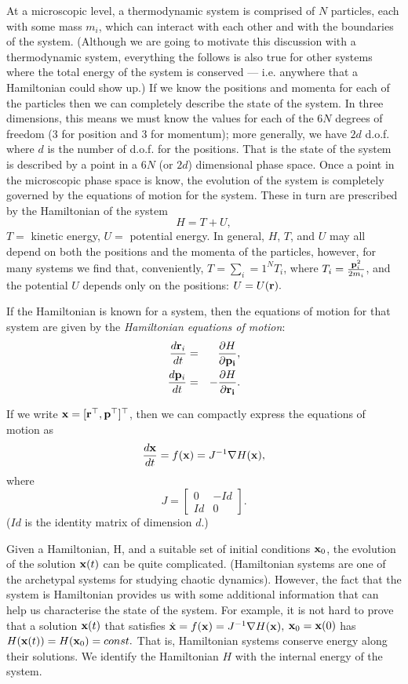 \documentclass{article}
\begin{document}
At a microscopic level, a thermodynamic system is comprised of $N$ particles, each with some mass $m_i$, which can interact with each other and with the boundaries of the system. (Although we are going to motivate this discussion with a thermodynamic system, everything the follows is also true for other systems where the total energy of the system is conserved --- i.e. anywhere that a Hamiltonian could show up.) If we know the positions and momenta  for each of the particles then we can completely describe the state of the system. In three dimensions, this means we must know the values for each of the $6N$ degrees of freedom (3 for position and 3 for momentum); more generally, we have $2d$ d.o.f. where $d$ is the number of d.o.f. for the positions. That is the state of the system is described by a point in a $6N$ (or $2d$) dimensional phase space.
Once a point in the microscopic phase space is know, the evolution of the system is completely governed by the equations of motion for the system. These in turn are prescribed by the Hamiltonian of the system
$$H = T+U,$$
$T=$ kinetic energy, $U=$ potential energy. In general, $H$, $T$, and $U$ may all depend on both the positions and the momenta of the particles, however, for many systems we find that, conveniently, $T = \sum_i=1^N T_i$, where $T_i=\frac{{\bf p}_i^2}{2m_i}$, and the potential $U$ depends only on the positions: $U = U({\bf r}).$

If the Hamiltonian is known for a system, then the equations of motion for that system are given by the \textit{Hamiltonian equations of motion}:
\begin{eqnarray*}
	\frac{d{\bf r}_i}{dt} &=& ~~\frac{\partial H}{\partial {\bf p_i}}, \\
	\frac{d{\bf p}_i}{dt} &=& -\frac{\partial H}{\partial {\bf r_i}}.
\end{eqnarray*}

If we write ${\bf x} = [{\bf r}^\top,{\bf p}^\top]^\top$, then we can compactly express the equations of motion as
\begin{equation}
	\frac{d{\bf x}}{dt} = f({\bf x}) = J^{-1}\nabla H({\bf x}),
\end{equation}
where
$$
	J = 
	\begin{bmatrix}
		0 & -Id\\
		Id & 0
	\end{bmatrix}.
$$
($Id$ is the identity matrix of dimension $d$.)

Given a Hamiltonian, H, and a suitable set of initial conditions ${\bf x}_0$, the evolution of the solution ${\bf x}(t)$ can be quite complicated. (Hamiltonian systems are one of the archetypal systems for studying chaotic dynamics). However, the fact that the system is Hamiltonian provides us with some additional information that can help us characterise the state of the system. For example, it is not hard to prove that a solution ${\bf x}(t)$ that satisfies $\dot{\bf x} = f({\bf x}) = J^{-1}\nabla H({\bf x}),$ ${\bf x}_0 = {\bf x}(0)$ has $H({\bf x}(t)) = H({\bf x}_0)= const.$ That is, Hamiltonian systems conserve energy along their solutions. We identify the Hamiltonian $H$ with the internal energy of the system.
\end{document}
